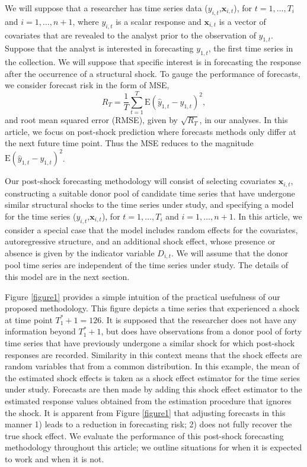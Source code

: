 \documentclass[11pt,3p,review,authoryear]{elsarticle}
\newcommand{\x}{\textbf{x}}
\def\E#1{\mathrm{E}(#1)} %
\theoremstyle{definition}
\begin{document}
We will suppose that a researcher has time series data ($y_{i,t}$,$\x_{i,t}$), for $t = 1, \ldots,  T_i$ and $i = 1, \ldots, n+1$, where $y_{i,t}$ is a scalar response and $\x_{i,t}$ is a vector of covariates that are revealed to the analyst prior to the observation of $y_{1,t}$.  Suppose that the analyst is interested in forecasting $y_{1,t}$, the first time series in the collection. We will suppose that specific interest is in forecasting the response after the occurrence of a structural shock. To gauge the performance of forecasts, we consider forecast risk in the form of MSE,
$$
  R_T = \frac{1}{T}\sum_{t=1}^T\E{\hat y_{1,t} - y_{1,t}}^2,
$$
and root mean squared error (RMSE), given by $\sqrt{R_T}$, in our analyses. In this article, we focus on post-shock prediction where forecasts methods only differ at the next future time point. Thus the MSE reduces to the magnitude $\E{\hat y_{1,t} - y_{1,t}}^2$.


Our post-shock forecasting methodology will consist of selecting covariates $\x_{i,t}$, constructing a suitable donor pool of candidate time series that have undergone similar structural shocks to the time series under study, and specifying a model for the time series ($y_{i,t}$,$\x_{i,t}$), for $t = 1, \ldots,  T_i$ and $i = 1, \ldots, n+1$. In this article, we consider a  special case that the model includes random effects for the covariates, autoregressive structure, and an additional shock effect, whose presence or absence is given by the indicator variable $D_{i,t}$.  We will assume that the donor pool time series are independent of the time series under study. The details of this model are in the next section.



Figure \ref{figure1} provides a simple intuition of the practical usefulness of our proposed methodology. This figure depicts a time series that experienced a shock at time point $T_1^*+1 = 126$. It is supposed that the researcher does not have any information beyond $T_1^*+1$, but does have observations from a donor pool of forty time series that have previously undergone a similar shock for which post-shock responses are recorded. Similarity in this context means that the shock effects are random variables that from a common distribution. In this example, the mean of the estimated shock effects is taken as a shock effect estimator for the time series under study. Forecasts are then made by adding this shock effect estimator to the estimated response values obtained from the estimation procedure that ignores the shock. It is apparent from Figure \ref{figure1} that adjusting forecasts in this manner 1) leads to a reduction in forecasting risk; 2) does not fully recover the true shock effect. We evaluate the performance of this post-shock forecasting methodology throughout this article; we outline situations for when it is expected to work and when it is not.
\end{document}
